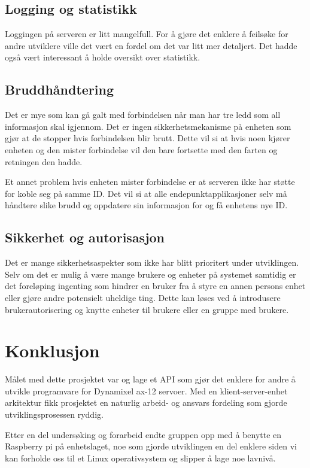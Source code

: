 \documentclass[12pt]{report}
\begin{document}
\section{Logging og statistikk}
Loggingen på serveren er litt mangelfull. For å gjøre det enklere å feilsøke for andre utviklere ville det vært en fordel om det var litt mer detaljert. Det hadde også vært interessant å holde oversikt over statistikk.

\section{Bruddhåndtering}
Det er mye som kan gå galt med forbindelsen når man har tre ledd som all informasjon skal igjennom. Det er ingen sikkerhetsmekanisme på enheten som gjør at de stopper hvis forbindelsen blir brutt. Dette vil si at hvis noen kjører enheten og den mister forbindelse vil den bare fortsette med den farten og retningen den hadde.

Et annet problem hvis enheten mister forbindelse er at serveren ikke har støtte for koble seg på samme ID. Det vil si at alle endepunktapplikasjoner selv må håndtere slike brudd og oppdatere sin informasjon for og få enhetens nye ID.

\section{Sikkerhet og autorisasjon}
Det er mange sikkerhetsaspekter som ikke har blitt prioritert under utviklingen. Selv om det er mulig å være mange brukere og enheter på systemet samtidig er det foreløping ingenting som hindrer en bruker fra å styre en annen persons enhet eller gjøre andre potensielt uheldige ting. Dette kan løses ved å introdusere brukerautorisering og knytte enheter til brukere eller en gruppe med brukere. 

\clearpage

\chapter{Konklusjon}
Målet med dette prosjektet var og lage et API som gjør det enklere for andre å utvikle programvare for Dynamixel ax-12 servoer. Med en klient-server-enhet arkitektur fikk prosjektet en naturlig arbeid- og ansvars fordeling som gjorde utviklingsprosessen ryddig. 

Etter en del undersøking og forarbeid endte gruppen opp med å benytte en Raspberry pi på enhetslaget, noe som gjorde utviklingen en del enklere siden vi kan forholde oss til et Linux operativsystem og slipper å lage noe lavnivå.
\end{document}
